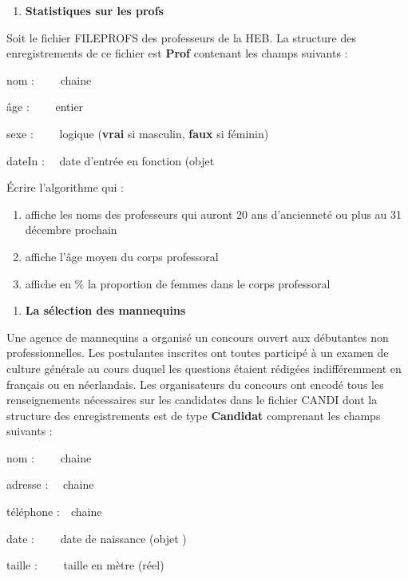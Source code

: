 \bigskip

\liststyleExercice
\begin{enumerate}
\item {\sffamily\bfseries
Statistiques sur les profs}
\end{enumerate}
{
{Soit le fichier FILEPROFS des professeurs de la
HEB. La structure des enregistrements de ce fichier est
}{\textbf{Prof}}{
contenant les champs suivants :}}

{
nom : \ \ \ \ chaine}

{
âge : \ \ \ \ entier}

{
{sexe : \ \ \ \ logique
(}{\textbf{vrai}}{ si
masculin,
}{\textbf{faux}}{ si
féminin)}}

{
{dateIn : \ \ date d’entrée en fonction (objet
}}

{
Écrire l’algorithme qui :}

\liststyleNumberingv
\begin{enumerate}
\item {
affiche les noms des professeurs qui auront 20 ans d’ancienneté ou plus
au 31 décembre prochain}
\item {
affiche l’âge moyen du corps professoral}
\item {
affiche en \% la proportion de femmes dans le corps professoral}
\end{enumerate}

\bigskip

\liststyleExercice
\begin{enumerate}
\item {\sffamily\bfseries
La sélection des mannequins}
\end{enumerate}
{
Une agence de mannequins a organisé un concours ouvert aux débutantes
non professionnelles. Les postulantes inscrites ont toutes participé à
un examen de culture générale au cours duquel les questions étaient
rédigées indifféremment en français ou en néerlandais. Les
organisateurs du concours ont encodé tous les renseignements
nécessaires sur les candidates dans le fichier CANDI dont la structure
des enregistrements est de type \textbf{Candidat} comprenant les champs
suivants :}

{
nom : \ \ \ \ chaine}

{
adresse : \ \ chaine}

{
téléphone :\ \ chaine}

{
date : \ \ \ \ date de naissance
({objet}{\textbf{\textit{
}}})}

{
taille : \ \ \ \ taille en mètre (réel)}

